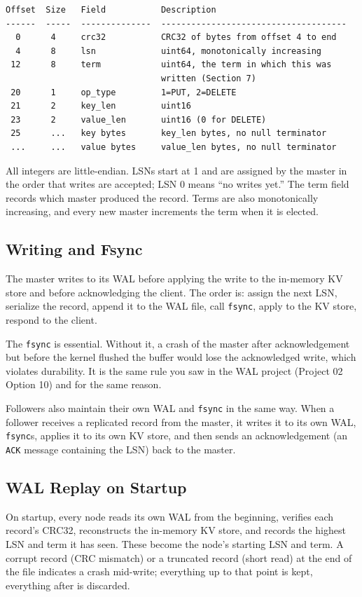\documentclass[11pt,a4paper]{article}
\begin{document}
\begin{codebox}
\begin{lstlisting}
Offset  Size   Field           Description
------  -----  --------------  -------------------------------------
  0      4     crc32           CRC32 of bytes from offset 4 to end
  4      8     lsn             uint64, monotonically increasing
 12      8     term            uint64, the term in which this was
                               written (Section 7)
 20      1     op_type         1=PUT, 2=DELETE
 21      2     key_len         uint16
 23      2     value_len       uint16 (0 for DELETE)
 25      ...   key bytes       key_len bytes, no null terminator
 ...     ...   value bytes     value_len bytes, no null terminator
\end{lstlisting}
\end{codebox}

All integers are little-endian. LSNs start at 1 and are assigned by the master in the order that writes are accepted; LSN 0 means ``no writes yet.'' The term field records which master produced the record. Terms are also monotonically increasing, and every new master increments the term when it is elected.

\subsection{Writing and Fsync}
The master writes to its WAL before applying the write to the in-memory KV store and before acknowledging the client. The order is: assign the next LSN, serialize the record, append it to the WAL file, call \texttt{fsync}, apply to the KV store, respond to the client.

The \texttt{fsync} is essential. Without it, a crash of the master after acknowledgement but before the kernel flushed the buffer would lose the acknowledged write, which violates durability. It is the same rule you saw in the WAL project (Project 02 Option 10) and for the same reason.

Followers also maintain their own WAL and \texttt{fsync} in the same way. When a follower receives a replicated record from the master, it writes it to its own WAL, \texttt{fsync}s, applies it to its own KV store, and then sends an acknowledgement (an \texttt{ACK} message containing the LSN) back to the master.

\subsection{WAL Replay on Startup}
On startup, every node reads its own WAL from the beginning, verifies each record's CRC32, reconstructs the in-memory KV store, and records the highest LSN and term it has seen. These become the node's starting LSN and term. A corrupt record (CRC mismatch) or a truncated record (short read) at the end of the file indicates a crash mid-write; everything up to that point is kept, everything after is discarded.
\end{document}
